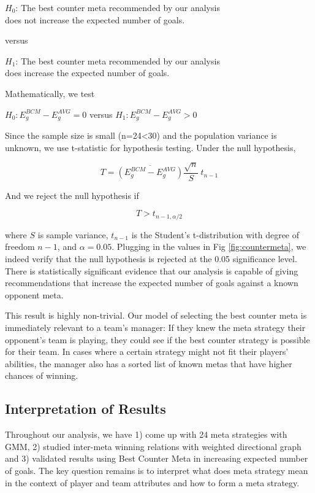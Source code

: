 \documentclass{article}
\begin{document}
\begin{center}
\(H_{0}\): The best counter meta recommended by our analysis\\
does not increase the expected number of goals.
\end{center}

versus

\begin{center}
\(H_{1}\): The best counter meta recommended by our analysis\\
does increase the expected number of goals.
\end{center}

Mathematically, we test

\begin{center}
\(H_{0}: E_{g}^{BCM} - E_{g}^{AVG} = 0\) versus \(H_{1}: E_{g}^{BCM} - E_{g}^{AVG} > 0\)
\end{center}

Since the sample size is small (n=24<30) and the population variance is unknown, we use t-statistic for hypothesis testing. Under the null hypothesis,

\[T=\overline{(E_{g}^{BCM} - E_{g}^{AVG})} \frac{\sqrt{n}}{S}~t_{n-1}\]

And we reject the null hypothesis if

\[T>t_{n-1, \alpha/2}\]

where \(S\) is sample variance, \(t_{n-1}\) is the Student's t-distribution with degree of freedom \(n-1\), and \(\alpha=0.05\). Plugging in the values in Fig \ref{fig:countermeta}, we indeed verify that the null hypothesis is rejected at the 0.05 significance level. There is statistically significant evidence that our analysis is capable of giving recommendations that increase the expected number of goals against a known opponent meta.

This result is highly non-trivial. Our model of selecting the best counter meta is immediately relevant to a team's manager: If they knew the meta strategy their opponent's team is playing, they could see if the best counter strategy is possible for their team. In cases where a certain strategy might not fit their players' abilities, the manager also has a sorted list of known metas that have higher chances of winning.

\subsection{Interpretation of Results}
Throughout our analysis, we have 1) come up with 24 meta strategies with GMM, 2) studied inter-meta winning relations with weighted directional graph and 3) validated results using Best Counter Meta in increasing expected number of goals. The key question remains is to interpret what does meta strategy mean in the context of player and team attributes and how to form a meta strategy.
\end{document}
